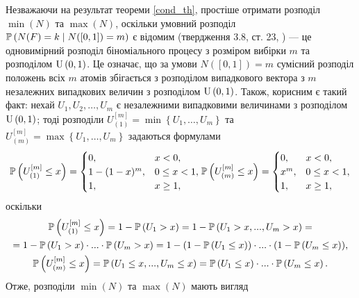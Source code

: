 Незважаючи на результат теореми \ref{cond_th}, простіше отримати розподіл
 $\min(N)$ та $\max(N)$, %
оскільки умовний розподіл $\P{N(F) = k \mid N([0, 1]) = m}$ 
є відомим (твердження 3.8, ст. 23, \cite{last_penrose_2017}) --- це
одновимірний розподіл
біноміального процесу з розміром вибірки $m$ та розподілом $\Unif{0, 1}$.
Це означає, що за умови $N([0, 1]) = m$
сумісний розподіл положень всіх $m$ атомів збігається з 
розподілом випадкового вектора 
з $m$ незалежних 
випадкових величин з розподілом $\Unif{0, 1}$.
Також, корисним є такий факт: нехай $U_1, U_2, \dots, U_m$ є
незалежними випадковими величинами з розподілом $\Unif{0, 1}$;
тоді розподіли $U_{(1)}^{[m]} = \min\left\{U_1, \dots, U_m\right\}$ 
та $U_{(m)}^{[m]} = \max\left\{U_1, \dots, U_m\right\}$ задаються
формулами
\begin{gather*}
    \P{U_{(1)}^{[m]} \leq x} = \begin{cases}
        0, & x < 0, \\
        1 - (1 - x)^m, & 0 \leq x < 1, \\
        1, & x \geq 1,
    \end{cases}
    \P{U_{(m)}^{[m]} \leq x} = \begin{cases}
        0, & x < 0, \\
        x^m, & 0 \leq x < 1, \\
        1, & x \geq 1,
    \end{cases}
\end{gather*}
оскільки
\begin{gather*}
    \P{U_{(1)}^{[m]} \leq x} = 1 - \P{U_{{1}} > x} = 1 - \P{U_1 > x, ..., U_m > x} = 
    \\ = 1 - \P{U_1 > x} \cdot ... \cdot \P{U_m > x} = 
    1 - (1 - \P{U_1 \leq x}) \cdot ... \cdot (1 - \P{U_m \leq x}), \\
    \P{U_{(m)}^{[m]} \leq x} = \P{U_1 \leq x, ..., U_m \leq x} = 
    \P{U_1 \leq x} \cdot ... \cdot \P{U_m \leq x}.
\end{gather*}
Отже, розподіли $\min(N)$ та $\max(N)$ мають вигляд
